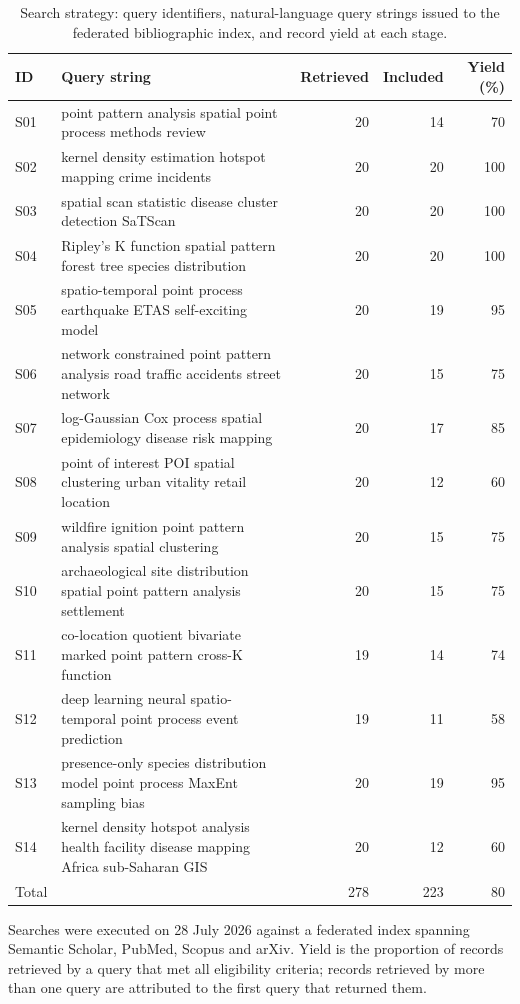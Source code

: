 \begin{table}[htbp]
\centering
\footnotesize
\caption{Search strategy: query identifiers, natural-language query strings issued to the federated bibliographic index, and record yield at each stage.}
\label{tab:search}
\begin{tabular}{llrrr}
\toprule
ID & Query string & Retrieved & Included & Yield (\%) \\
\midrule
S01 & point pattern analysis spatial point process methods review & 20 & 14 & 70 \\
S02 & kernel density estimation hotspot mapping crime incidents & 20 & 20 & 100 \\
S03 & spatial scan statistic disease cluster detection SaTScan & 20 & 20 & 100 \\
S04 & Ripley's K function spatial pattern forest tree species distribution & 20 & 20 & 100 \\
S05 & spatio-temporal point process earthquake ETAS self-exciting model & 20 & 19 & 95 \\
S06 & network constrained point pattern analysis road traffic accidents street network & 20 & 15 & 75 \\
S07 & log-Gaussian Cox process spatial epidemiology disease risk mapping & 20 & 17 & 85 \\
S08 & point of interest POI spatial clustering urban vitality retail location & 20 & 12 & 60 \\
S09 & wildfire ignition point pattern analysis spatial clustering & 20 & 15 & 75 \\
S10 & archaeological site distribution spatial point pattern analysis settlement & 20 & 15 & 75 \\
S11 & co-location quotient bivariate marked point pattern cross-K function & 19 & 14 & 74 \\
S12 & deep learning neural spatio-temporal point process event prediction & 19 & 11 & 58 \\
S13 & presence-only species distribution model point process MaxEnt sampling bias & 20 & 19 & 95 \\
S14 & kernel density hotspot analysis health facility disease mapping Africa sub-Saharan GIS & 20 & 12 & 60 \\
Total &  & 278 & 223 & 80 \\
\bottomrule
\end{tabular}
\begin{minipage}{\linewidth}\vspace{4pt}\scriptsize Searches were executed on 28 July 2026 against a federated index spanning Semantic Scholar, PubMed, Scopus and arXiv. Yield is the proportion of records retrieved by a query that met all eligibility criteria; records retrieved by more than one query are attributed to the first query that returned them.\end{minipage}
\end{table}
